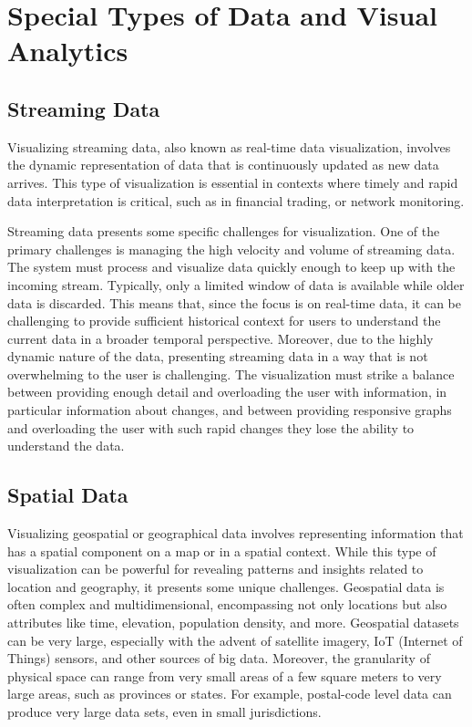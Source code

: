 \section{Special Types of Data and Visual Analytics}

\subsection*{Streaming Data}

Visualizing streaming data, also known as real-time data visualization, involves the dynamic representation of data that is continuously updated as new data arrives. This type of visualization is essential in contexts where timely and rapid data interpretation is critical, such as in financial trading, or network monitoring. 

Streaming data presents some specific challenges for visualization. One of the primary challenges is managing the high velocity and volume of streaming data. The system must process and visualize data quickly enough to keep up with the incoming stream. Typically, only a limited window of data is available while older data is discarded. This means that, since the focus is on real-time data, it can be challenging to provide sufficient historical context for users to understand the current data in a broader temporal perspective. Moreover, due to the highly dynamic nature of the data, presenting streaming data in a way that is not overwhelming to the user is challenging. The visualization must strike a balance between providing enough detail and overloading the user with information, in particular information about changes, and between providing responsive graphs and overloading the user with such rapid changes they lose the ability to understand the data.

\subsection*{Spatial Data}

Visualizing geospatial or geographical data involves representing information that has a spatial component on a map or in a spatial context. While this type of visualization can be powerful for revealing patterns and insights related to location and geography, it presents some unique challenges. Geospatial data is often complex and multidimensional, encompassing not only locations but also attributes like time, elevation, population density, and more. Geospatial datasets can be very large, especially with the advent of satellite imagery, IoT (Internet of Things) sensors, and other sources of big data. Moreover, the granularity of physical space can range from very small areas of a few square meters to very large areas, such as provinces or states. For example, postal-code level data can produce very large data sets, even in small jurisdictions. 

